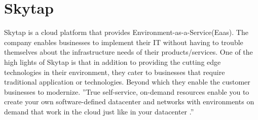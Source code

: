 \section{Skytap}
Skytap is a cloud platform that provides Environment-as-a-Service(Eaas). The
company enables businesses to implement their IT without having to
trouble themselves about the infrastructure needs of their products/services.
One of the high lights of Skytap is that in addition to providing the
cutting edge technologies in their environment, they cater to businesses that
require traditional application or technologies. Beyond which they enable the
customer businesses to modernize. ''True self-service, on-demand resources
enable you to create your own software-defined datacenter and networks with
environments on demand that work in the cloud just like in your datacenter
.''\cite{hid-sp18-411-skytap}